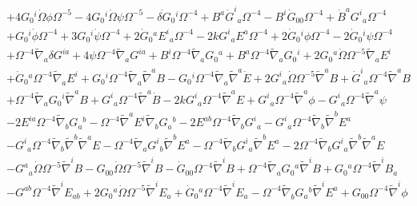\documentclass[10pt,letterpaper]{article}
\numberwithin{equation}{section}
\begin{document}
\begin{eqnarray}
&& + 4 G_{0}{}^{i} \dot{\Omega} \phi \Omega^{-5} - 4 G_{0}{}^{i} \dot{\Omega} \psi \Omega^{-5} -  \dot{\delta G}_{0}{}^{i} \Omega^{-4} + B^{a} \dot{G}^{i}{}_{a} \Omega^{-4} -  B^{i} \dot{G}_{00}{} \Omega^{-4} + \dot{B}^{a} G^{i}{}_{a} \Omega^{-4} \nonumber \\ 
&& + G_{0}{}^{i} \dot{\phi} \Omega^{-4} + 3 G_{0}{}^{i} \dot{\psi} \Omega^{-4} + 2 \dot{G}_{0}{}^{a} E^{i}{}_{a} \Omega^{-4} - 2 k G^{i}{}_{a} E^{a} \Omega^{-4} + 2 \dot{G}_{0}{}^{i} \phi \Omega^{-4} - 2 \dot{G}_{0}{}^{i} \psi \Omega^{-4} \nonumber \\ 
&& + \Omega^{-4} \tilde{\nabla}_{a}\delta G^{ia} + 4 \psi \Omega^{-4} \tilde{\nabla}_{a}G^{ia} + B^{i} \Omega^{-4} \tilde{\nabla}_{a}G_{0}{}^{a} + B^{a} \Omega^{-4} \tilde{\nabla}_{a}G_{0}{}^{i} + 2 G_{0}{}^{a} \dot{\Omega} \Omega^{-5} \tilde{\nabla}_{a}E^{i} \nonumber \\ 
&& + \dot{G}_{0}{}^{a} \Omega^{-4} \tilde{\nabla}_{a}E^{i} + G_{0}{}^{i} \Omega^{-4} \tilde{\nabla}_{a}\tilde{\nabla}^{a}B -  G_{0}{}^{i} \Omega^{-4} \tilde{\nabla}_{a}\tilde{\nabla}^{a}\dot{E} + 2 G^{i}{}_{a} \dot{\Omega} \Omega^{-5} \tilde{\nabla}^{a}B + \dot{G}^{i}{}_{a} \Omega^{-4} \tilde{\nabla}^{a}B \nonumber \\ 
&& + \Omega^{-4} \tilde{\nabla}_{a}G_{0}{}^{i} \tilde{\nabla}^{a}B + G^{i}{}_{a} \Omega^{-4} \tilde{\nabla}^{a}\dot{B} - 2 k G^{i}{}_{a} \Omega^{-4} \tilde{\nabla}^{a}E + G^{i}{}_{a} \Omega^{-4} \tilde{\nabla}^{a}\phi -  G^{i}{}_{a} \Omega^{-4} \tilde{\nabla}^{a}\psi \nonumber \\ 
&& - 2 E^{ia} \Omega^{-4} \tilde{\nabla}_{b}G_{a}{}^{b} -  \Omega^{-4} \tilde{\nabla}^{a}E^{i} \tilde{\nabla}_{b}G_{a}{}^{b} - 2 E^{ab} \Omega^{-4} \tilde{\nabla}_{b}G^{i}{}_{a} -  G^{i}{}_{a} \Omega^{-4} \tilde{\nabla}_{b}\tilde{\nabla}^{b}E^{a} \nonumber \\ 
&& -  G^{i}{}_{a} \Omega^{-4} \tilde{\nabla}_{b}\tilde{\nabla}^{b}\tilde{\nabla}^{a}E -  \Omega^{-4} \tilde{\nabla}_{a}G^{i}{}_{b} \tilde{\nabla}^{b}E^{a} -  \Omega^{-4} \tilde{\nabla}_{b}G^{i}{}_{a} \tilde{\nabla}^{b}E^{a} - 2 \Omega^{-4} \tilde{\nabla}_{b}G^{i}{}_{a} \tilde{\nabla}^{b}\tilde{\nabla}^{a}E \nonumber \\ 
&& -  G^{a}{}_{a} \dot{\Omega} \Omega^{-5} \tilde{\nabla}^{i}B -  G_{00}{} \dot{\Omega} \Omega^{-5} \tilde{\nabla}^{i}B -  \dot{G}_{00}{} \Omega^{-4} \tilde{\nabla}^{i}B + \Omega^{-4} \tilde{\nabla}_{a}G_{0}{}^{a} \tilde{\nabla}^{i}B + G_{0}{}^{a} \Omega^{-4} \tilde{\nabla}^{i}B_{a} \nonumber \\ 
&& -  G^{ab} \Omega^{-4} \tilde{\nabla}^{i}E_{ab} + 2 G_{0}{}^{a} \dot{\Omega} \Omega^{-5} \tilde{\nabla}^{i}E_{a} + \dot{G}_{0}{}^{a} \Omega^{-4} \tilde{\nabla}^{i}E_{a} -  \Omega^{-4} \tilde{\nabla}_{b}G_{a}{}^{b} \tilde{\nabla}^{i}E^{a} + G_{00}{} \Omega^{-4} \tilde{\nabla}^{i}\phi \nonumber \\ 

\end{eqnarray}
\end{document}
